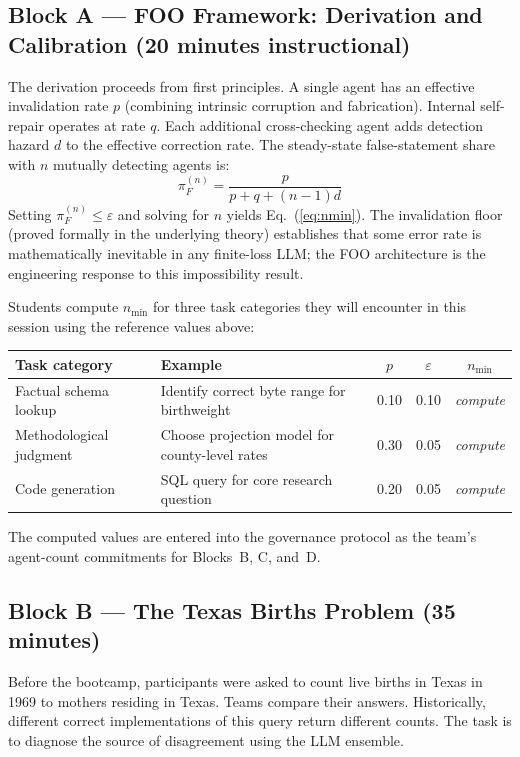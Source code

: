 \subsection*{Block A --- FOO Framework: Derivation and Calibration
(20 minutes instructional)}

The derivation proceeds from first principles. A single agent has
an effective invalidation rate $p$ (combining intrinsic corruption
and fabrication). Internal self-repair operates at rate $q$.
Each additional cross-checking agent adds detection hazard $d$
to the effective correction rate. The steady-state false-statement
share with $n$ mutually detecting agents is:
%
\begin{equation}
    \pi_F^{(n)} = \frac{p}{p + q + (n-1)d}
    \label{eq:steadystate}
\end{equation}
%
Setting $\pi_F^{(n)} \leq \varepsilon$ and solving for $n$ yields
Eq.~(\ref{eq:nmin}). The invalidation floor (proved formally in the
underlying theory) establishes that some error rate is
mathematically inevitable in any finite-loss LLM; the FOO
architecture is the engineering response to this impossibility
result.

Students compute $n_{\min}$ for three task categories they will
encounter in this session using the reference values above:
{\footnotesize
\begin{center}
\begin{tabular}{llccc}
\toprule
Task category & Example & $p$ & $\varepsilon$ & $n_{\min}$ \\
\midrule
Factual schema lookup & Identify correct byte range for birthweight & 0.10 & 0.10 & \emph{compute} \\
Methodological judgment & Choose projection model
    for county-level rates & 0.30 & 0.05 & \emph{compute} \\
Code generation & SQL query for core
    research question & 0.20 & 0.05 & \emph{compute} \\
\bottomrule
\end{tabular}
\end{center}
}
%
The computed values are entered into the governance protocol as
the team's agent-count commitments for Blocks~B, C, and~D.

\subsection*{Block B --- The Texas Births Problem (35 minutes)}

Before the bootcamp, participants were asked to count live births
in Texas in 1969 to mothers residing in Texas. Teams compare their
answers. Historically, different correct implementations of this
query return different counts. The task is to diagnose the source
of disagreement using the LLM ensemble.

